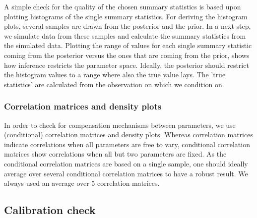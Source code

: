 \documentclass[12pt]{extreport}
\begin{document}
A simple check for the quality of the chosen summary statistics is based upon plotting histograms of the single summary statistics. For deriving the histogram plots, several samples are drawn from the posterior and the prior. In a next step, we simulate data from these samples and calculate the summary statistics from the simulated data.
Plotting the range of values for each single summary statistic coming from the posterior versus the ones that are coming from the prior, shows how inference restricts the parameter space. 
Ideally, the posterior should restrict the histogram values to a range where also the true value lays. The 'true statistics' are calculated from the observation on which we condition on. 

\subsubsection{Correlation matrices and density plots}

In order to check for compensation mechanisms between parameters, we use (conditional) correlation matrices and density plots. Whereas correlation matrices indicate correlations when all parameters are free to vary, conditional correlation matrices show correlations when all but two parameters are fixed. As the conditional correlation matrices are based on a single sample, one should ideally average over several conditional correlation matrices to have a robust result. We always used an average over 5 correlation matrices. 




\subsection{Calibration check}
\label{sec:sbc}
\end{document}

